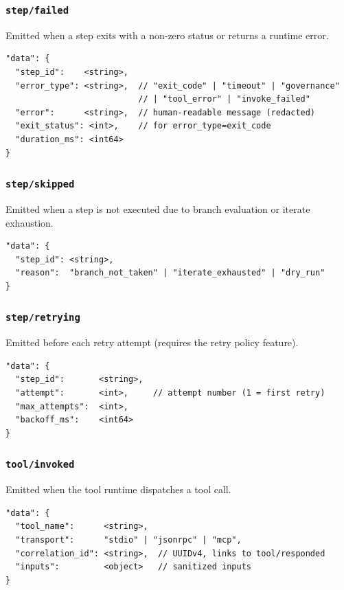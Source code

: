 \subsubsection{\texttt{step/failed}}

Emitted when a step exits with a non-zero status or returns a runtime error.

\begin{verbatim}
"data": {
  "step_id":    <string>,
  "error_type": <string>,  // "exit_code" | "timeout" | "governance"
                           // | "tool_error" | "invoke_failed"
  "error":      <string>,  // human-readable message (redacted)
  "exit_status": <int>,    // for error_type=exit_code
  "duration_ms": <int64>
}
\end{verbatim}

\subsubsection{\texttt{step/skipped}}

Emitted when a step is not executed due to branch evaluation or iterate exhaustion.

\begin{verbatim}
"data": {
  "step_id": <string>,
  "reason":  "branch_not_taken" | "iterate_exhausted" | "dry_run"
}
\end{verbatim}

\subsubsection{\texttt{step/retrying}}

Emitted before each retry attempt (requires the retry policy feature).

\begin{verbatim}
"data": {
  "step_id":       <string>,
  "attempt":       <int>,     // attempt number (1 = first retry)
  "max_attempts":  <int>,
  "backoff_ms":    <int64>
}
\end{verbatim}

\subsubsection{\texttt{tool/invoked}}

Emitted when the tool runtime dispatches a tool call.

\begin{verbatim}
"data": {
  "tool_name":      <string>,
  "transport":      "stdio" | "jsonrpc" | "mcp",
  "correlation_id": <string>,  // UUIDv4, links to tool/responded
  "inputs":         <object>   // sanitized inputs
}
\end{verbatim}

